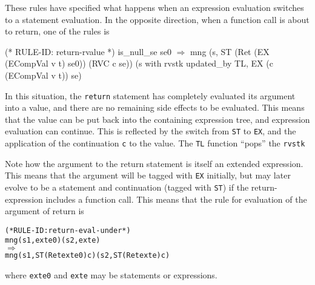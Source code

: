 \documentclass[11pt]{article}
\begin{document}
These rules have specified what happens when an expression evaluation
switches to a statement evaluation.  In the opposite direction, when a
function call is about to return, one of the rules is %
%
\label{rule:return-rvalue}%
\begin{stdrule}
(* RULE-ID: return-rvalue *)
     is_null_se se0
   \(\Rightarrow\)
     mng (s, ST (Ret (EX (ECompVal v t) se0)) (RVC c se))
         (s with rvstk updated_by TL, EX (c (ECompVal v t)) se)
\end{stdrule}
In this situation, the \texttt{return} statement has completely
evaluated its argument into a value, and there are no remaining side
effects to be evaluated.  This means that the value can be put back
into the containing expression tree, and expression evaluation can
continue.  This is reflected by the switch from \texttt{ST} to
\texttt{EX}, and the application of the continuation \texttt{c} to the
value.  The \texttt{TL}%
function ``pops'' the \texttt{rvstk}

Note how the argument to the return statement is itself an extended
expression.  This means that the argument will be tagged with
\texttt{EX} initially, but may later evolve to be a statement and
continuation (tagged with \texttt{ST}) if the return-expression
includes a function call.  This means that the rule for evaluation of
the argument of return is
\begin{center}
\begin{minipage}{\textwidth}
\begin{alltt}
(* RULE-ID: return-eval-under *)
     mng (s1, exte0) (s2, exte)
   \(\Rightarrow\)
     mng (s1, ST (Ret exte0) c) (s2, ST (Ret exte) c)
\end{alltt}
\end{minipage}
\end{center}
where \texttt{exte0} and \texttt{exte} may be statements or
expressions.
\end{document}
